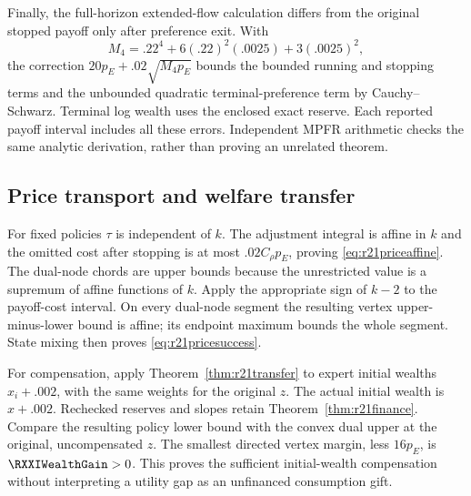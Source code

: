 Finally, the full-horizon extended-flow calculation differs from the original stopped payoff only after preference exit. With
\[
 M_4=.22^4+6(.22)^2(.0025)+3(.0025)^2,
\]
the correction $20p_E+.02\sqrt{M_4p_E}$ bounds the bounded running and stopping terms and the unbounded quadratic terminal-preference term by Cauchy--Schwarz. Terminal log wealth uses the enclosed exact reserve. Each reported payoff interval includes all these errors. Independent MPFR arithmetic checks the same analytic derivation, rather than proving an unrelated theorem.

\subsection{Price transport and welfare transfer}
For fixed policies $\tau$ is independent of $k$. The adjustment integral is affine in $k$ and the omitted cost after stopping is at most $.02C_\rho p_E$, proving \eqref{eq:r21priceaffine}. The dual-node chords are upper bounds because the unrestricted value is a supremum of affine functions of $k$. Apply the appropriate sign of $k-2$ to the payoff-cost interval. On every dual-node segment the resulting vertex upper-minus-lower bound is affine; its endpoint maximum bounds the whole segment. State mixing then proves \eqref{eq:r21pricesuccess}.

For compensation, apply Theorem~\ref{thm:r21transfer} to expert initial wealths $x_i+.002$, with the same weights for the original $z$. The actual initial wealth is $x+.002$. Rechecked reserves and slopes retain Theorem~\ref{thm:r21finance}. Compare the resulting policy lower bound with the convex dual upper at the original, uncompensated $z$. The smallest directed vertex margin, less $16p_E$, is $\RXXIWealthGain>0$. This proves the sufficient initial-wealth compensation without interpreting a utility gap as an unfinanced consumption gift.
